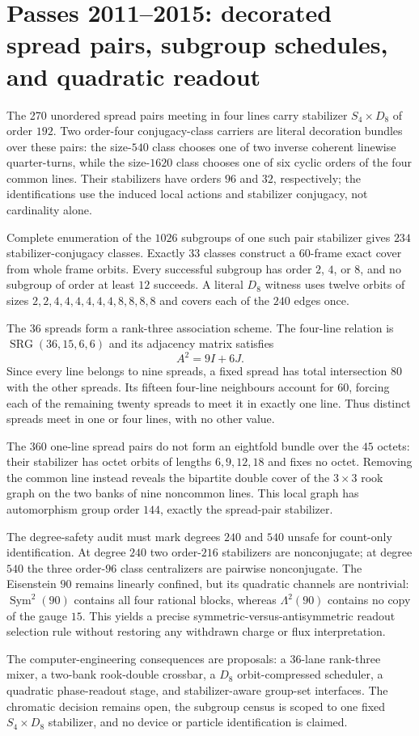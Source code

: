 \section*{Passes 2011--2015: decorated spread pairs, subgroup schedules, and quadratic readout}
The 270 unordered spread pairs meeting in four lines carry stabilizer
$S_4\times D_8$ of order $192$.  Two order-four conjugacy-class carriers are
literal decoration bundles over these pairs: the size-$540$ class chooses one of
two inverse coherent linewise quarter-turns, while the size-$1620$ class chooses
one of six cyclic orders of the four common lines.  Their stabilizers have orders
$96$ and $32$, respectively; the identifications use the induced local actions
and stabilizer conjugacy, not cardinality alone.

Complete enumeration of the $1026$ subgroups of one such pair stabilizer gives
$234$ stabilizer-conjugacy classes.  Exactly $33$ classes construct a
$60$-frame exact cover from whole frame orbits.  Every successful subgroup has
order $2$, $4$, or $8$, and no subgroup of order at least $12$ succeeds.  A
literal $D_8$ witness uses twelve orbits of sizes
$2,2,4,4,4,4,4,4,8,8,8,8$ and covers each of the $240$ edges once.

The $36$ spreads form a rank-three association scheme.  The four-line relation
is $\operatorname{SRG}(36,15,6,6)$ and its adjacency matrix satisfies
\[
 A^2=9I+6J.
\]
Since every line belongs to nine spreads, a fixed spread has total intersection
$80$ with the other spreads.  Its fifteen four-line neighbours account for
$60$, forcing each of the remaining twenty spreads to meet it in exactly one
line.  Thus distinct spreads meet in one or four lines, with no other value.

The $360$ one-line spread pairs do not form an eightfold bundle over the $45$
octets: their stabilizer has octet orbits of lengths $6,9,12,18$ and fixes no
octet.  Removing the common line instead reveals the bipartite double cover of
the $3\times3$ rook graph on the two banks of nine noncommon lines.  This local
graph has automorphism group order $144$, exactly the spread-pair stabilizer.

The degree-safety audit must mark degrees $240$ and $540$ unsafe for count-only
identification.  At degree $240$ two order-$216$ stabilizers are nonconjugate;
at degree $540$ the three order-$96$ class centralizers are pairwise
nonconjugate.  The Eisenstein $90$ remains linearly confined, but its quadratic
channels are nontrivial: $\operatorname{Sym}^2(90)$ contains all four rational
blocks, whereas $\Lambda^2(90)$ contains no copy of the gauge $15$.  This yields
a precise symmetric-versus-antisymmetric readout selection rule without
restoring any withdrawn charge or flux interpretation.

The computer-engineering consequences are proposals: a $36$-lane rank-three
mixer, a two-bank rook-double crossbar, a $D_8$ orbit-compressed scheduler, a
quadratic phase-readout stage, and stabilizer-aware group-set interfaces.  The
chromatic decision remains open, the subgroup census is scoped to one fixed
$S_4\times D_8$ stabilizer, and no device or particle identification is claimed.
